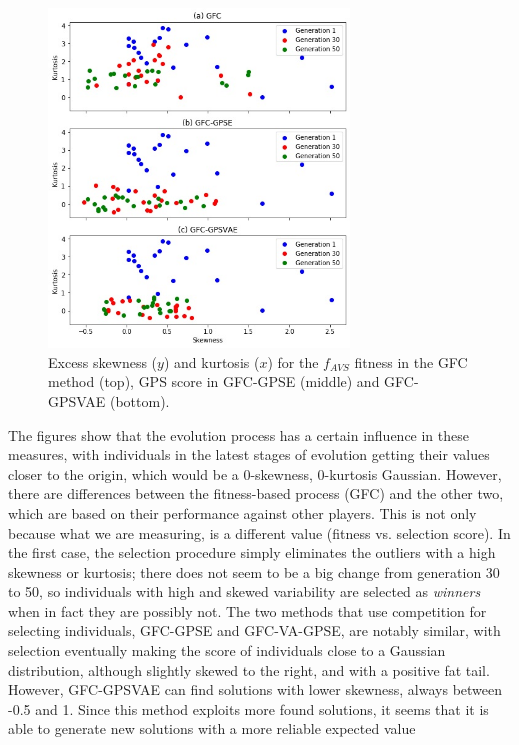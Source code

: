 \documentclass[10pt,journal,compsoc]{IEEEtran}
\begin{document}
\begin{figure}[ht]	
	\begin{center}
		\includegraphics[width=8cm, height=9cm]{fig/skew1}
		\caption{Excess skewness ($y$) and kurtosis ($x$)
			for the $f_{AVS}$ fitness in the  {\sf GFC} method \cite{salem_cig2018} (top), GPS score in {\sf GFC-GPSE} (middle) and {\sf GFC-GPSVAE} (bottom).}
		\label{fig:gfcsk}
	\end{center}	
\end{figure}
The figures show that the evolution process has a certain influence in
these measures, with individuals in the latest stages of evolution
getting their values closer to the origin, which would be a 0-skewness, 0-kurtosis
Gaussian. 	However, there are differences between the fitness-based
process ({\sf GFC}) and the other two, which are based on their
performance against other players. This is not only because what we are measuring, is a different value (fitness vs. selection score).
In the first case, the
selection procedure simply eliminates the outliers with a high
skewness or kurtosis; there does not seem to be a big change from
generation 30 to 50, so individuals with high
and skewed variability are selected as {\em winners} when in fact they
are possibly not.
The two methods that use competition for selecting individuals, {\sf
  GFC-GPSE} and {\sf GFC-VA-GPSE}, are
notably similar, with selection eventually making the score of
individuals close to a Gaussian distribution, although slightly skewed
to the right, and with a positive fat tail. However, {\sf GFC-GPSVAE} can find solutions with lower skewness, always between -0.5 and
1. Since this method exploits more found solutions, it seems that it
is able to generate new solutions with a more reliable expected value
\end{document}

